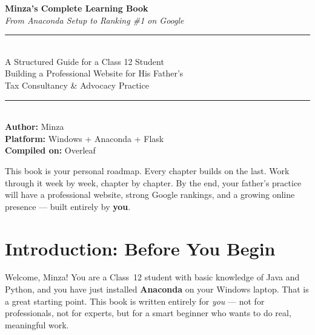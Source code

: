 \documentclass[12pt, a4paper]{book}
\begin{document}

\begin{titlepage}
  \centering
  \vspace*{2cm}
  {\Huge\bfseries\color{primaryblue} Minza's Complete Learning Book}\\[0.8cm]
  {\large\itshape From Anaconda Setup to Ranking \#1 on Google}\\[0.4cm]
  \rule{\linewidth}{0.4pt}\\[0.6cm]
  {\large A Structured Guide for a Class 12 Student\\
  Building a Professional Website for His Father's\\
  Tax Consultancy \& Advocacy Practice}\\[0.6cm]
  \rule{\linewidth}{0.4pt}\\[1.5cm]
  {\large\bfseries Author:} {\large Minza}\\[0.3cm]
  {\large\bfseries Platform:} {\large Windows + Anaconda + Flask}\\[0.3cm]
  {\large\bfseries Compiled on:} {\large Overleaf}\\[2cm]
  \begin{tcolorbox}[notebox, width=0.85\linewidth]
    This book is your personal roadmap. Every chapter builds on the last.
    Work through it week by week, chapter by chapter.
    By the end, your father's practice will have a professional website,
    strong Google rankings, and a growing online presence — built entirely by \textbf{you}.
  \end{tcolorbox}
\end{titlepage}

\tableofcontents
\newpage

\chapter*{Introduction: Before You Begin}

Welcome, Minza! You are a Class~12 student with basic knowledge of Java and Python,
and you have just installed \textbf{Anaconda} on your Windows laptop.
That is a great starting point. This book is written entirely for \emph{you} ---
not for professionals, not for experts, but for a smart beginner who wants
to do real, meaningful work.
\end{document}
